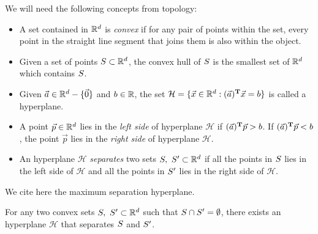 \documentclass{article}
\newcommand{\cH}{\mathcal{H}}
\begin{document}
We will need the following concepts from topology:
\begin{itemize}
\item A  set contained in $\mathbb{R}^d$  is \textit{convex} if for any
  pair of points within the set, every point in the straight line
  segment that joins them is also within the object.
\item Given a set of points $S\subset\mathbb{R}^{d}$, the convex hull of $S$ is the
  smallest set of $\mathbb{R}^{d}$ which contains $S$.
\item   Given $\vec{a}\in\mathbb{R}^d-\{\vec{0}\}$ and $b\in\mathbb{R}$, the set 
  $\cH = \{\vec{x}\in\RR^d : \transpose{\vec{a}}\vec{x}=b\}$ is called
  a hyperplane.
\item A point $\vec{p}\in\mathbb{R}^{d}$ lies in the \textit{left side} of
  hyperplane $\cH$ if $(\vec{a})^{\textbf{T}}\vec{p}>b$. If 
  $(\vec{a})^{\textbf{T}}\vec{p} < b$, the point $\vec{p}$ lies  in the
  \textit{right side} of hyperplane $\cH$.
\item An hyperplane $\cH$ \textit{separates} two sets $S,\
  S'\subset\mathbb{R}^d$ if all the points in $S$ lies in the left side
  of $\cH$ and all the points in $S'$ lies in the right side of $\cH$.
\end{itemize}
We cite here  the maximum separation hyperplane.
\begin{lemma}
  \label{lem:maximum_separation}
  For any two convex sets $S,\ S'\subset \mathbb{R}^d$ such that $S\cap S' =
  \emptyset$,  there exists an   hyperplane $\cH$ that separates
  $S$ and $S'$.
\end{lemma}
\end{document}
